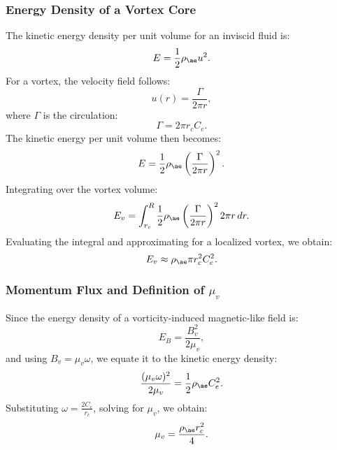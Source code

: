    \subsubsection*{Energy Density of a Vortex Core}
    The kinetic energy density per unit volume for an inviscid fluid is:
    \begin{equation}
        E = \frac{1}{2} \rho_{\ae} u^2.
    \end{equation}
    For a vortex, the velocity field follows:
    \begin{equation}
        u(r) = \frac{\Gamma}{2\pi r},
    \end{equation}
    where \( \Gamma \) is the circulation:
    \begin{equation}
        \Gamma = 2\pi r_c C_e.
    \end{equation}
    The kinetic energy per unit volume then becomes:
    \begin{equation}
        E = \frac{1}{2} \rho_{\ae} \left( \frac{\Gamma}{2\pi r} \right)^2.
    \end{equation}
    Integrating over the vortex volume:
    \begin{equation}
        E_v = \int_{r_c}^{R} \frac{1}{2} \rho_{\ae} \left( \frac{\Gamma}{2\pi r} \right)^2 2\pi r \, dr.
    \end{equation}
    Evaluating the integral and approximating for a localized vortex, we obtain:
    \begin{equation}
        E_v \approx \rho_{\ae} \pi r_c^2 C_e^2.
    \end{equation}

    \subsubsection*{Momentum Flux and Definition of \( \mu_v \)}
    Since the energy density of a vorticity-induced magnetic-like field is:
    \begin{equation}
        E_B = \frac{B_v^2}{2\mu_v},
    \end{equation}
    and using \( B_v = \mu_v \omega \), we equate it to the kinetic energy density:
    \begin{equation}
        \frac{(\mu_v \omega)^2}{2\mu_v} = \frac{1}{2} \rho_{\ae} C_e^2.
    \end{equation}
    Substituting \( \omega = \frac{2C_e}{r_c} \), solving for \( \mu_v \), we obtain:
    \begin{equation}
        \mu_v = \frac{\rho_{\ae} r_c^2}{4}.
    \end{equation}



